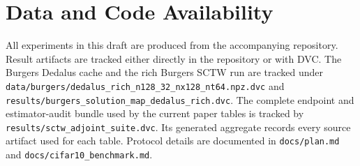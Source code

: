 \section{Data and Code Availability}
\label{sec:data-availability}

All experiments in this draft are produced from the accompanying repository. Result artifacts are
tracked either directly in the repository or with DVC. The Burgers Dedalus cache and the rich
Burgers SCTW run are tracked under
\verb|data/burgers/dedalus_rich_n128_32_nx128_nt64.npz.dvc| and
\verb|results/burgers_solution_map_dedalus_rich.dvc|. The complete endpoint and estimator-audit
bundle used by the current paper tables is tracked by
\verb|results/sctw_adjoint_suite.dvc|. Its generated aggregate records every source artifact used
for each table. Protocol details are documented in \verb|docs/plan.md| and
\verb|docs/cifar10_benchmark.md|.
